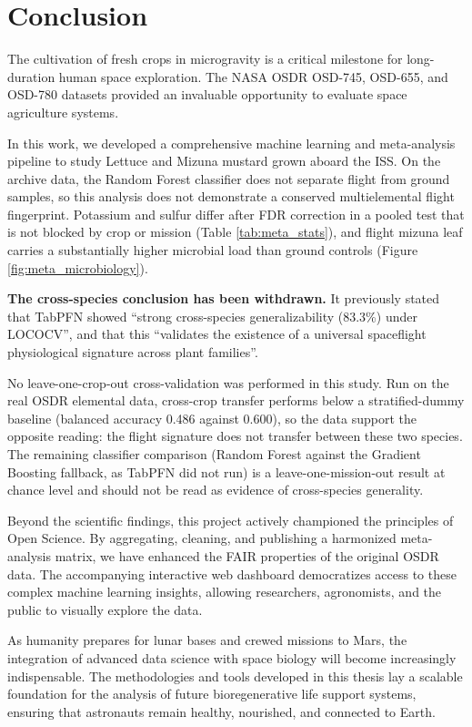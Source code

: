 \chapter{Conclusion}
\label{ch:conclusion}

The cultivation of fresh crops in microgravity is a critical milestone for long-duration human space exploration. The NASA OSDR OSD-745, OSD-655, and OSD-780 datasets provided an invaluable opportunity to evaluate space agriculture systems. 

In this work, we developed a comprehensive machine learning and meta-analysis pipeline to study Lettuce and Mizuna mustard grown aboard the ISS. On the archive data, the Random Forest classifier does not separate flight from ground samples, so this analysis does not demonstrate a conserved multielemental flight fingerprint. Potassium and sulfur differ after FDR correction in a pooled test that is not blocked by crop or mission (Table \ref{tab:meta_stats}), and flight mizuna leaf carries a substantially higher microbial load than ground controls (Figure \ref{fig:meta_microbiology}).

\textbf{The cross-species conclusion has been withdrawn.} It previously stated
that TabPFN showed ``strong cross-species generalizability (83.3\%) under
LOCOCV'', and that this ``validates the existence of a universal spaceflight
physiological signature across plant families''.

No leave-one-crop-out cross-validation was performed in this study. Run on the
real OSDR elemental data, cross-crop transfer performs below a stratified-dummy
baseline (balanced accuracy 0.486 against 0.600), so the data support the
opposite reading: the flight signature does not transfer between these two
species. The remaining classifier comparison (Random Forest against the Gradient
Boosting fallback, as TabPFN did not run) is a leave-one-mission-out result at
chance level and should not be read as evidence of cross-species generality.

Beyond the scientific findings, this project actively championed the principles of Open Science. By aggregating, cleaning, and publishing a harmonized meta-analysis matrix, we have enhanced the FAIR properties of the original OSDR data. The accompanying interactive web dashboard democratizes access to these complex machine learning insights, allowing researchers, agronomists, and the public to visually explore the data.

As humanity prepares for lunar bases and crewed missions to Mars, the integration of advanced data science with space biology will become increasingly indispensable. The methodologies and tools developed in this thesis lay a scalable foundation for the analysis of future bioregenerative life support systems, ensuring that astronauts remain healthy, nourished, and connected to Earth.

